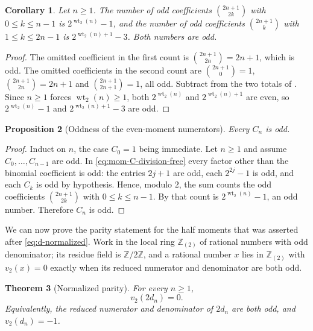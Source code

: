 \documentclass[11pt,oneside]{article}
\newtheorem{theorem}{Theorem}[section]
\newtheorem{proposition}[theorem]{Proposition}
\newtheorem{corollary}[theorem]{Corollary}
\theoremstyle{definition}
\theoremstyle{remark}
\newcommand{\Z}{\mathbb Z}
\newcommand{\wt}{\operatorname{wt}_2}
\newcommand{\vtwo}{v_2}
\begin{document}
\begin{corollary}                                          \label{cor:mom-lucas-trimmed}
Let $n\ge1$.  The number of odd coefficients $\binom{2n+1}{2k}$ with $0\le k\le n-1$ is
$2^{\wt(n)}-1$, and the number of odd coefficients $\binom{2n+1}{k}$ with $1\le k\le2n-1$ is
$2^{\wt(n)+1}-3$.  Both numbers are odd.
\end{corollary}

\begin{proof}
The omitted coefficient in the first count is $\binom{2n+1}{2n}=2n+1$, which is odd.  The
omitted coefficients in the second count are $\binom{2n+1}{0}=1$,
$\binom{2n+1}{2n}=2n+1$ and $\binom{2n+1}{2n+1}=1$, all odd.  Subtract from the two totals of
.  Since $n\ge1$ forces $\wt(n)\ge1$, both $2^{\wt(n)}$ and
$2^{\wt(n)+1}$ are even, so $2^{\wt(n)}-1$ and $2^{\wt(n)+1}-3$ are odd.
\end{proof}

\begin{proposition}[Oddness of the even-moment numerators]  \label{prop:mom-C-odd}
Every $C_n$ is odd.
\end{proposition}

\begin{proof}
Induct on $n$, the case $C_0=1$ being immediate.  Let $n\ge1$ and assume
$C_0,\ldots,C_{n-1}$ are odd.  In \eqref{eq:mom-C-division-free} every factor other than the
binomial coefficient is odd: the entries $2j+1$ are odd, each $2^{2j}-1$ is odd, and each
$C_k$ is odd by hypothesis.  Hence, modulo $2$, the sum counts the odd coefficients
$\binom{2n+1}{2k}$ with $0\le k\le n-1$.  By  that count is
$2^{\wt(n)}-1$, an odd number.  Therefore $C_n$ is odd.
\end{proof}

We can now prove the parity statement for the half moments that was asserted after
\eqref{eq:d-normalized}.  Work in the local ring $\Z_{(2)}$ of rational numbers with odd
denominator; its residue field is $\Z/2\Z$, and a rational number $x$ lies in $\Z_{(2)}$
with $\vtwo(x)=0$ exactly when its reduced numerator and denominator are both odd.

\begin{theorem}[Normalized parity]                          \label{thm:mom-two-d-odd}
For every $n\ge1$,
\begin{equation}
 \vtwo(2d_n)=0.                                            \label{eq:mom-two-d-valuation}
\end{equation}
Equivalently, the reduced numerator and denominator of $2d_n$ are both odd, and
$\vtwo(d_n)=-1$.
\end{theorem}
\end{document}
